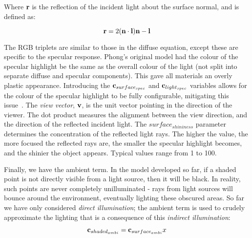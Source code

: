 Where \begin{math}\mathbf{r}\end{math} is the reflection of the incident light about the surface normal, and is defined as:

\begin{equation}
	\mathbf{r} = 2(\mathbf{n}\cdot\mathbf{l})\mathbf{n} - \mathbf{l}
\end{equation}

The RGB triplets are similar to those in the diffuse equation, except these are specific to the specular response. Phong's original model had the colour of the specular highlight be the same as the overall colour of the light (not split into separate diffuse and specular components). This gave all materials an overly plastic appearance. Introducing the \begin{math}\mathbf{c}_{surface_{spec}}\end{math} and \begin{math}\mathbf{c}_{light_{spec}}\end{math} variables allows for the colour of the specular highlight to be fully configurable, mitigating this issue~\cite{LightingModelForComputerAnimators}. The \textit{view vector}, \begin{math}\mathbf{v}\end{math}, is the unit vector pointing in the direction of the viewer. The dot product measures the alignment between the view direction, and the direction of the reflected incident light. The \begin{math}surface_{shininess}\end{math} parameter determines the concentration of the reflected light rays. The higher the value, the more focused the reflected rays are, the smaller the specular highlight becomes, and the shinier the object appears. Typical values range from 1 to 100.

Finally, we have the ambient term. In the model developed so far, if a shaded point is not directly visible from a light source, then it will be black. In reality, such points are never completely unilluminated - rays from light sources will bounce around the environment, eventually lighting these obscured areas. So far we have only considered \textit{direct illumination}; the ambient term is used to crudely approximate the lighting that is a consequence of this \textit{indirect illumination}:

\begin{equation}
	\mathbf{c}_{shaded_{ambi}} = \mathbf{c}_{surface_{ambi}}x
\end{equation}


